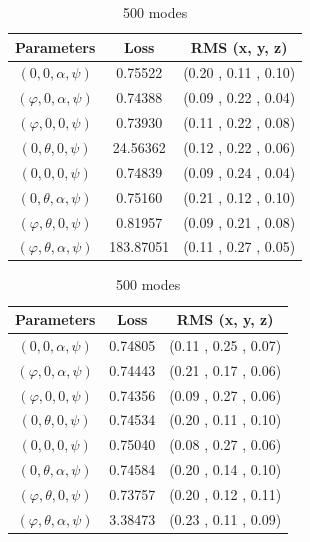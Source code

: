 \documentclass[a4paper,12pt]{article}
\theoremstyle{definition}
\begin{document}
\begin{table}[!htb]
    \caption{Losses obtain for different parameter combination}
    \begin{subtable}{.5\linewidth}
      \centering
        \caption{250 modes}
        \begin{tabular}{ c | c | c}
        Parameters & Loss & RMS (x, y, z)\\
        \hline
        $(0,0,\alpha,\psi)$ & 0.75522 & (0.20 , 0.11 , 0.10)\\
        $(\varphi,0, \alpha,\psi)$ & 0.74388 & (0.09 , 0.22 , 0.04)\\
        $(\varphi, 0,0,\psi)$ & 0.73930 & (0.11 , 0.22 , 0.08)\\
        $(0, \theta, 0,\psi)$ & 24.56362 & (0.12 , 0.22 , 0.06)\\
        $(0, 0, 0,\psi)$ & 0.74839 & (0.09 , 0.24 , 0.04)\\
        $(0,\theta, \alpha,\psi)$ & 0.75160 & (0.21 , 0.12 , 0.10)\\
        $(\varphi,\theta,0,\psi)$ & 0.81957 & (0.09 , 0.21 , 0.08)\\
        $(\varphi,\theta,\alpha,\psi)$ & 183.87051 & (0.11 , 0.27 , 0.05)\\
        \end{tabular}
    \end{subtable}%
    \begin{subtable}{.5\linewidth}
      \centering
        \caption{500 modes}
        \begin{tabular}{ c | c | c}
        Parameters & Loss & RMS (x, y, z)\\
        \hline
        $(0,0,\alpha,\psi)$ & 0.74805 & (0.11 , 0.25 , 0.07)\\
        $(\varphi,0, \alpha,\psi)$ & 0.74443 & (0.21 , 0.17 , 0.06)\\
        $(\varphi, 0,0,\psi)$ & 0.74356 & (0.09 , 0.27 , 0.06)\\
        $(0, \theta, 0,\psi)$ & 0.74534 & (0.20 , 0.11 , 0.10)\\
        $(0, 0, 0,\psi)$ & 0.75040 & (0.08 , 0.27 , 0.06)\\
        $(0,\theta, \alpha,\psi)$ & 0.74584 & (0.20 , 0.14 , 0.10)\\
        $(\varphi,\theta,0,\psi)$ & 0.73757 & (0.20 , 0.12 , 0.11)\\
        $(\varphi,\theta,\alpha,\psi)$ &  3.38473  & (0.23 , 0.11 , 0.09)\\
        \end{tabular}
    \end{subtable} 
\end{table}
\end{document}
